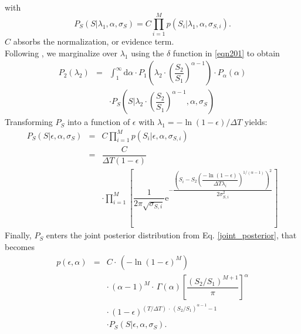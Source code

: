 \documentclass{aa}
\begin{document}
\begin{appendix}
\begin{eqnarray}
\end{eqnarray}
with
\begin{equation}
    P_S(S | \lambda_1, \alpha, \sigma_S) = C\displaystyle \prod_{i=1}^M p(S_i | \lambda_1, \alpha, \sigma_{S,i}).
\end{equation}
$C$ absorbs the normalization, or evidence term.
\\
Following \citet{wheatland_flaresbayes_2004}, we marginalize over $\lambda_1$ using the $\delta$ function in \ref{eqn201} to obtain
\begin{eqnarray}
\label{eqn21}
P_2(\lambda_2) &=& \displaystyle \int_{1}^{\infty} \mathrm{d}\alpha \cdot P_1\left(\lambda_2 \cdot\left(\dfrac{S_2}{S_1}\right)^{\alpha-1}\right) \cdot P_{\alpha}(\alpha)\nonumber\\
&&\cdot P_S\left(S| \lambda_2 \cdot\left(\dfrac{S_2}{S_1}\right)^{\alpha-1}, \alpha, \sigma_S\right)
\end{eqnarray}
Transforming $P_S$ into a function of $\epsilon$ with $\lambda_1=-\ln(1-\epsilon)/\Delta T$ yields:
\begin{eqnarray}
    P_S(S | \epsilon, \alpha, \sigma_S) &=& C \displaystyle \prod_{i=1}^M p(S_i | \epsilon, \alpha, \sigma_{S,i})\nonumber\\
    &=& \dfrac{C}{\Delta T(1-\epsilon)}\nonumber\\
    &&\cdot \displaystyle \prod_{i=1}^M \left[\dfrac{1}{2\pi \sqrt{\sigma_{S,i}}}\mathrm{e}^{-\dfrac{\left(S_i - S_2\left(\dfrac{-\ln(1-\epsilon)}{\Delta T\lambda_i}\right)^{1/(\alpha-1)}\right)^2}{2\sigma_{S,i}^2}}\right]
\end{eqnarray}
Finally, $P_S$ enters the joint posterior distribution from Eq. \ref{joint_posterior}, that becomes
\begin{eqnarray}
\label{joint_posterior2}
p(\epsilon, \alpha) &=& C \cdot\, (-\ln(1 - \epsilon)^{M})\nonumber\\
                    && \cdot\, (\alpha-1)^M \cdot\, \Gamma(\alpha) \left[\dfrac{(S_2 / S_1)^{M+1}}{\pi} \right]^{\alpha}\nonumber\\
                    && \cdot\, (1-\epsilon)^{(T / \Delta T) \,\cdot\, (S_2 /S_1)^{\alpha-1} -1 }\nonumber\\
                    &&\cdot P_S(S | \epsilon, \alpha, \sigma_S).
\end{eqnarray}
\end{appendix}
\end{document}
